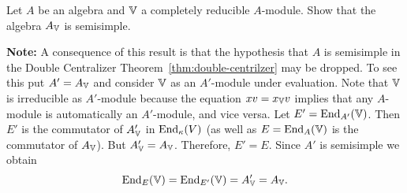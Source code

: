 \begin{probl}\label{probl:semisimplicity-of-A_V}
    Let\/ $A$ be an algebra and\/ $\mathbb V$ a completely reducible\/ $A$-module. Show that the algebra\/ $A_\mathbb V$ is semisimple.

    \textrm{\rm\textbf{Note:} A consequence of this result is that the hypothesis that\/ $A$ is semisimple in the Double Centralizer Theorem~\ref{thm:double-centrilzer} may be dropped. To see this put $A'=A_\mathbb V$ and consider $\mathbb V$ as an $A'$-module under evaluation. Note that $\mathbb V$ is irreducible as $A'$-module because the equation $xv=x_\mathbb V v$ implies that any $A$-module is automatically an $A'$-module, and vice versa. Let $E'={\operatorname{End}}_{A'}(\mathbb V)$. Then $E'$ is the commutator of $A'_\mathbb V$ in ${\operatorname{End}}_\kappa(V)$ (as well as $E={\operatorname{End}}_A(\mathbb V)$ is the commutator of $A_\mathbb V$). But $A'_\mathbb V=A_\mathbb V$. Therefore, $E'=E$. Since $A'$ is semisimple we obtain 
    $$
        {\operatorname{End}}_E(\mathbb V)={\operatorname{End}}_{E'}(\mathbb V)=A'_\mathbb V=A_\mathbb V.
    $$}
\end{probl}

